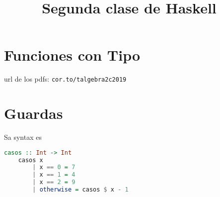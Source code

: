 \documentclass{article}
\title{Segunda clase de Haskell}
\begin{document}
	\maketitle
	\section{Funciones con Tipo}
	url de los pdfs: \texttt{cor.to/talgebra2c2019}
	\section{Guardas}
	Sa syntax es
	\begin{lstlisting}[language=Haskell]
	casos :: Int -> Int
	casos x
		| x == 0 = 7
		| x == 1 = 4
		| x == 2 = 9
		| otherwise = casos $ x - 1
	\end{lstlisting}
\end{document}
